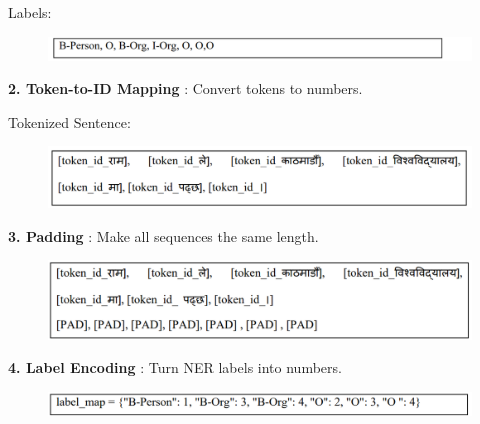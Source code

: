            Labels:
           
\begin{figure}[H]
\centering
\includegraphics [scale=0.8]{img/workingPrinciple/org.png}

\end{figure}
 
\textbf{2.	Token-to-ID Mapping} : Convert tokens to numbers.
          
Tokenized Sentence:

\begin{figure}[H]
\centering
\includegraphics [scale=0.8]{img/workingPrinciple/token.png}

\end{figure}
 
\textbf{3.	Padding} : Make all sequences the same length.

\begin{figure}[H]
\centering
\includegraphics [scale=0.8]{img/workingPrinciple/token pad.png}

\end{figure}
 
\textbf{4.	Label Encoding} : Turn NER labels into numbers.
\begin{figure}[H]
\centering
\includegraphics [scale=0.8]{img/workingPrinciple/lebelmap.png}

\end{figure}
 
